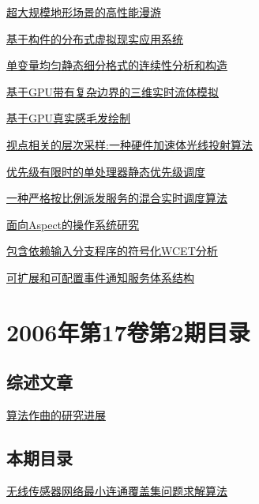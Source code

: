 \documentclass[a4paper]{article}
\begin{document}
\href{http://www.jos.org.cn/ch/reader/download_pdf.aspx?file_no=20060322&year_id=2006&quarter_id=3&falg=1}{超大规模地形场景的高性能漫游}

\href{http://www.jos.org.cn/ch/reader/download_pdf.aspx?file_no=20060323&year_id=2006&quarter_id=3&falg=1}{基于构件的分布式虚拟现实应用系统}

\href{http://www.jos.org.cn/ch/reader/download_pdf.aspx?file_no=20060324&year_id=2006&quarter_id=3&falg=1}{单变量均匀静态细分格式的连续性分析和构造}

\href{http://www.jos.org.cn/ch/reader/download_pdf.aspx?file_no=20060325&year_id=2006&quarter_id=3&falg=1}{基于GPU带有复杂边界的三维实时流体模拟}

\href{http://www.jos.org.cn/ch/reader/download_pdf.aspx?file_no=20060326&year_id=2006&quarter_id=3&falg=1}{基于GPU真实感毛发绘制}

\href{http://www.jos.org.cn/ch/reader/download_pdf.aspx?file_no=20060327&year_id=2006&quarter_id=3&falg=1}{视点相关的层次采样:一种硬件加速体光线投射算法}

\href{http://www.jos.org.cn/ch/reader/download_pdf.aspx?file_no=20060328&year_id=2006&quarter_id=3&falg=1}{优先级有限时的单处理器静态优先级调度}

\href{http://www.jos.org.cn/ch/reader/download_pdf.aspx?file_no=20060329&year_id=2006&quarter_id=3&falg=1}{一种严格按比例派发服务的混合实时调度算法}

\href{http://www.jos.org.cn/ch/reader/download_pdf.aspx?file_no=20060330&year_id=2006&quarter_id=3&falg=1}{面向Aspect的操作系统研究}

\href{http://www.jos.org.cn/ch/reader/download_pdf.aspx?file_no=20060331&year_id=2006&quarter_id=3&falg=1}{包含依赖输入分支程序的符号化WCET分析}

\href{http://www.jos.org.cn/ch/reader/download_pdf.aspx?file_no=20060332&year_id=2006&quarter_id=3&falg=1}{可扩展和可配置事件通知服务体系结构}


\section{\textbf{2006年第17卷第2期目录}}
\subsection{综述文章}
\href{http://www.jos.org.cn/ch/reader/download_pdf.aspx?file_no=20060205&year_id=2006&quarter_id=2&falg=1}{算法作曲的研究进展}

\subsection{本期目录}
\href{http://www.jos.org.cn/ch/reader/download_pdf.aspx?file_no=20060201&year_id=2006&quarter_id=2&falg=1}{无线传感器网络最小连通覆盖集问题求解算法}
\end{document}
